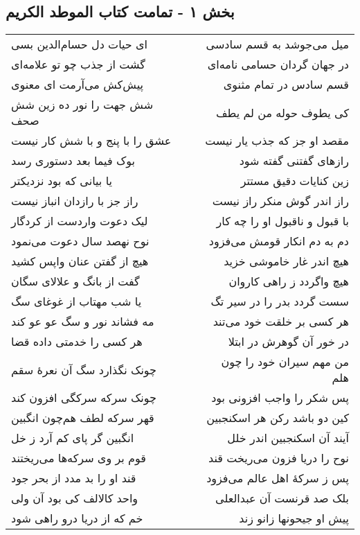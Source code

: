 \begin{center}
\section*{بخش ۱ - تمامت کتاب الموطد الکریم}
\label{sec:sh001}
\begin{longtable}{l p{0.5cm} r}
ای حیات دل حسام‌الدین بسی
&&
میل می‌جوشد به قسم سادسی
\\
گشت از جذب چو تو علامه‌ای
&&
در جهان گردان حسامی نامه‌ای
\\
پیش‌کش می‌آرمت ای معنوی
&&
قسم سادس در تمام مثنوی
\\
شش جهت را نور ده زین شش صحف
&&
کی یطوف حوله من لم یطف
\\
عشق را با پنج و با شش کار نیست
&&
مقصد او جز که جذب یار نیست
\\
بوک فیما بعد دستوری رسد
&&
رازهای گفتنی گفته شود
\\
یا بیانی که بود نزدیکتر
&&
زین کنایات دقیق مستتر
\\
راز جز با رازدان انباز نیست
&&
راز اندر گوش منکر راز نیست
\\
لیک دعوت واردست از کردگار
&&
با قبول و ناقبول او را چه کار
\\
نوح نهصد سال دعوت می‌نمود
&&
دم به دم انکار قومش می‌فزود
\\
هیچ از گفتن عنان واپس کشید
&&
هیچ اندر غار خاموشی خزید
\\
گفت از بانگ و علالای سگان
&&
هیچ واگردد ز راهی کاروان
\\
یا شب مهتاب از غوغای سگ
&&
سست گردد بدر را در سیر تگ
\\
مه فشاند نور و سگ عو عو کند
&&
هر کسی بر خلقت خود می‌تند
\\
هر کسی را خدمتی داده قضا
&&
در خور آن گوهرش در ابتلا
\\
چونک نگذارد سگ آن نعرهٔ سقم
&&
من مهم سیران خود را چون هلم
\\
چونک سرکه سرکگی افزون کند
&&
پس شکر را واجب افزونی بود
\\
قهر سرکه لطف هم‌چون انگبین
&&
کین دو باشد رکن هر اسکنجبین
\\
انگبین گر پای کم آرد ز خل
&&
آیند آن اسکنجبین اندر خلل
\\
قوم بر وی سرکه‌ها می‌ریختند
&&
نوح را دریا فزون می‌ریخت قند
\\
قند او را بد مدد از بحر جود
&&
پس ز سرکهٔ اهل عالم می‌فزود
\\
واحد کالالف کی بود آن ولی
&&
بلک صد قرنست آن عبدالعلی
\\
خم که از دریا درو راهی شود
&&
پیش او جیحونها زانو زند

\end{longtable}
\end{center}
